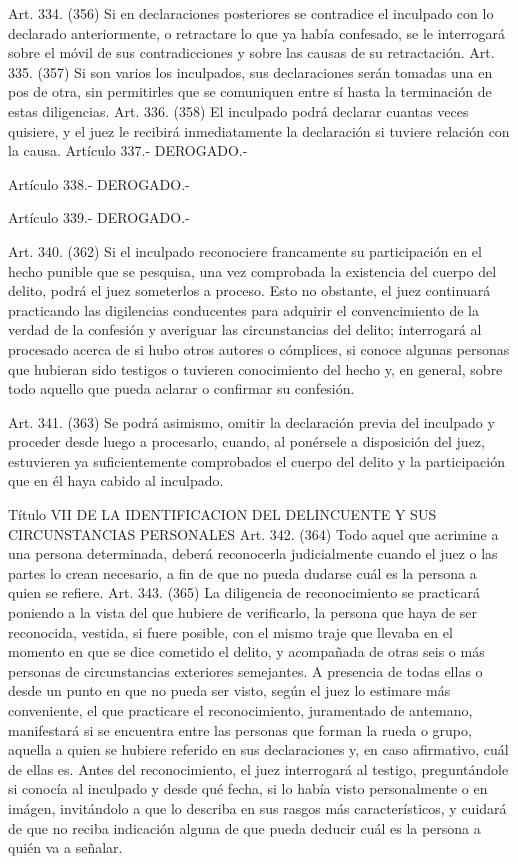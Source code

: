     Art. 334. (356) Si en declaraciones posteriores se contradice el inculpado con lo declarado anteriormente, o retractare lo que ya había confesado, se le interrogará sobre el móvil de sus contradicciones y sobre las causas de su retractación.
    Art. 335. (357) Si son varios los inculpados, sus declaraciones serán tomadas una en pos de otra, sin permitirles que se comuniquen entre sí hasta la terminación de estas diligencias.
    Art. 336. (358) El inculpado podrá declarar cuantas veces quisiere, y el juez le recibirá inmediatamente la declaración si tuviere relación con la causa.
    Artículo 337.- DEROGADO.-


    Artículo 338.- DEROGADO.-


    Artículo 339.- DEROGADO.-


    Art. 340. (362) Si el inculpado reconociere francamente su participación en el hecho punible que se pesquisa, una vez comprobada la existencia del cuerpo del delito, podrá el juez someterlos a proceso.
    Esto no obstante, el juez continuará practicando las digilencias conducentes para adquirir el convencimiento de la verdad de la confesión y averiguar las circunstancias del delito; interrogará al procesado acerca de si hubo otros autores o cómplices, si conoce algunas personas que hubieran sido testigos o tuvieren conocimiento del hecho y, en general, sobre todo aquello que pueda aclarar o confirmar su confesión.

    Art. 341. (363) Se podrá asimismo, omitir la declaración previa del inculpado y proceder desde luego a procesarlo, cuando, al ponérsele a disposición del juez, estuvieren ya suficientemente comprobados el cuerpo del delito y la participación que en él haya cabido al inculpado.

    Título VII
    DE LA IDENTIFICACION DEL DELINCUENTE Y SUS
CIRCUNSTANCIAS PERSONALES
    Art. 342. (364) Todo aquel que acrimine a una persona determinada, deberá reconocerla judicialmente cuando el juez o las partes lo crean necesario, a fin de que no pueda dudarse cuál es la persona a quien se refiere.
    Art. 343. (365) La diligencia de reconocimiento se practicará poniendo a la vista del que hubiere de verificarlo, la persona que haya de ser reconocida, vestida, si fuere posible, con el mismo traje que llevaba en el momento en que se dice cometido el delito, y acompañada de otras seis o más personas de circunstancias exteriores semejantes.
    A presencia de todas ellas o desde un punto en que no pueda ser visto, según el juez lo estimare más conveniente, el que practicare el reconocimiento, juramentado de antemano, manifestará si se encuentra entre las personas que forman la rueda o grupo, aquella a quien se hubiere referido en sus declaraciones y, en caso afirmativo, cuál de ellas es.
    Antes del reconocimiento, el juez interrogará al testigo, preguntándole si conocía al inculpado y desde qué fecha, si lo había visto personalmente o en imágen, invitándolo a que lo describa en sus rasgos más característicos, y cuidará de que no reciba indicación alguna de que pueda deducir cuál es la persona a quién va a señalar.

